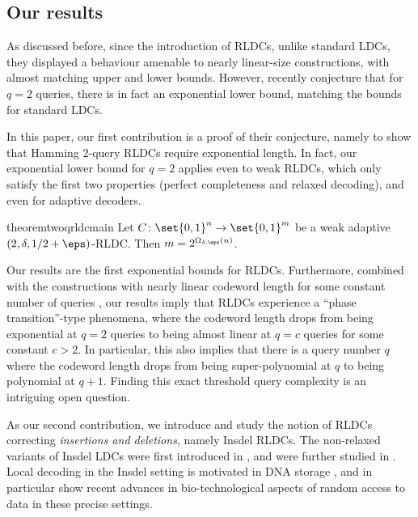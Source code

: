 \subsection{Our results}

As discussed before, since the introduction of RLDCs, unlike standard LDCs, they displayed a behaviour amenable to nearly linear-size constructions, with almost matching upper and lower bounds. However, recently \cite{GurL21} conjecture that for $q=2$ queries, there is in fact an exponential lower bound, matching the bounds for standard LDCs. 
 
In this paper, our first contribution is a proof of their conjecture, namely to show that Hamming $2$-query RLDCs  require exponential length. In fact, our exponential lower bound for $q=2$ applies even to weak RLDCs, which only satisfy the first two properties (perfect completeness and relaxed decoding), and even for adaptive decoders. 


\begin{restatable}{theorem}{twoqrldcmain} \label{thm:main-2qRLDC}
	Let $C \colon \set{0,1}^n \rightarrow \set{0,1}^m$ be a weak adaptive $(2,\delta,1/2+\eps)$-RLDC. Then $m = 2^{\Omega_{\delta,\eps}(n)}$.
\end{restatable}
Our results are the first exponential bounds for RLDCs. Furthermore, combined with the constructions with nearly linear codeword length for some constant number of queries \cite{Ben-SassonGHSV06, AsadiS21}, our results imply that RLDCs experience a ``phase transition''-type phenomena, where the codeword length drops from being exponential at $q=2$ queries to being almost linear at $q=c$ queries for some constant $c> 2$. In particular, this also implies that there is a query number $q$ where the codeword length drops from being super-polynomial at $q$ to being polynomial at $q+1$. Finding this exact threshold query complexity is an intriguing open question.    




As our second contribution, we introduce and study the notion of RLDCs  correcting {\em insertions and deletions}, namely  Insdel RLDCs. 
The non-relaxed variants of Insdel LDCs  were first introduced in \cite{Ostrovsky-InsdelLDC-Compiler}, and were further studied in \cite{BlockBGKZ20,ChengLZ20,block2021private}. Local decoding in the Insdel setting is  motivated in DNA storage \cite{Olgica17}, and in particular  \cite{Banaletal-nature2021} show recent advances in bio-technological aspects of random access to data in these precise settings.

